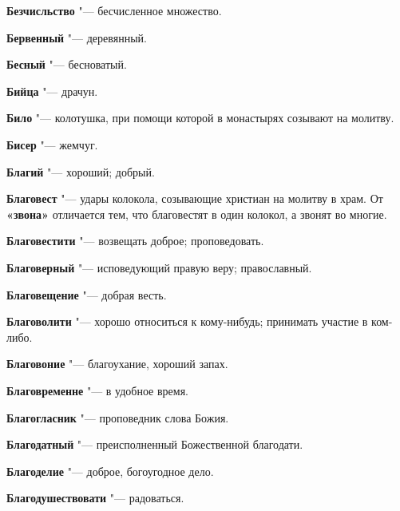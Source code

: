 \begin{mymulticols}{2}
\noindent\textbf{Безчисльство} "--- бесчисленное множество. 




\noindent\textbf{Бервенный} "--- деревянный. 




\noindent\textbf{Бесный} "--- бесноватый. 




\noindent\textbf{Бийца} "--- драчун. 




\noindent\textbf{Било} "--- колотушка, при помощи которой в монастырях созывают на молитву. 




\noindent\textbf{Бисер} "--- жемчуг. 




\noindent\textbf{Благий} "--- хороший; добрый. 




\noindent\textbf{Благовест} "--- удары колокола, созывающие христиан на молитву в храм. От \textbf{«звона»} отличается тем, что благовестят в один колокол, а звонят во многие. 



\noindent\textbf{Благовестити} "--- возвещать доброе; проповедовать. 




\noindent\textbf{Благоверный} "--- исповедующий правую веру; православный. 




\noindent\textbf{Благовещение} "--- добрая весть. 




\noindent\textbf{Благоволити} "--- хорошо относиться к кому-нибудь; принимать участие в ком-либо. 




\noindent\textbf{Благовоние} "--- благоухание, хороший запах. 




\noindent\textbf{Благовременне} "--- в удобное время. 




\noindent\textbf{Благогласник} "--- проповедник слова Божия. 




\noindent\textbf{Благодатный} "--- преисполненный Божественной благодати. 




\noindent\textbf{Благоделие} "--- доброе, богоугодное дело. 




\noindent\textbf{Благодушествовати} "--- радоваться. 





\end{mymulticols}
